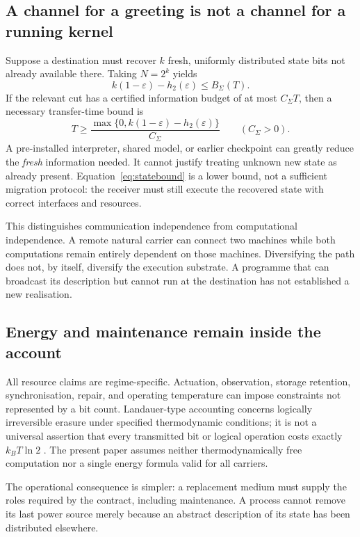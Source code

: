 \documentclass[11pt,a4paper]{article}
\theoremstyle{definition}
\theoremstyle{remark}
\begin{document}
\subsection{A channel for a greeting is not a channel for a running kernel}
Suppose a destination must recover $k$ fresh, uniformly distributed state bits not already available there. Taking $N=2^k$ yields
\begin{equation}\label{eq:statebound}
 k(1-\varepsilon)-h_2(\varepsilon)\leq B_\Sigma(T).
\end{equation}
If the relevant cut has a certified information budget of at most $C_\Sigma T$, then a necessary transfer-time bound is
\begin{equation}\label{eq:timebound}
 T\geq\frac{\max\{0,k(1-\varepsilon)-h_2(\varepsilon)\}}{C_\Sigma}
 \qquad(C_\Sigma>0).
\end{equation}
A pre-installed interpreter, shared model, or earlier checkpoint can greatly reduce the \emph{fresh} information needed. It cannot justify treating unknown new state as already present. Equation~\eqref{eq:statebound} is a lower bound, not a sufficient migration protocol: the receiver must still execute the recovered state with correct interfaces and resources.

This distinguishes communication independence from computational independence. A remote natural carrier can connect two machines while both computations remain entirely dependent on those machines. Diversifying the path does not, by itself, diversify the execution substrate. A programme that can broadcast its description but cannot run at the destination has not established a new realisation.

\subsection{Energy and maintenance remain inside the account}
All resource claims are regime-specific. Actuation, observation, storage retention, synchronisation, repair, and operating temperature can impose constraints not represented by a bit count. Landauer-type accounting concerns logically irreversible erasure under specified thermodynamic conditions; it is not a universal assertion that every transmitted bit or logical operation costs exactly $k_BT\ln2$ \citep{bennett}. The present paper assumes neither thermodynamically free computation nor a single energy formula valid for all carriers.

The operational consequence is simpler: a replacement medium must supply the roles required by the contract, including maintenance. A process cannot remove its last power source merely because an abstract description of its state has been distributed elsewhere.
\end{document}
